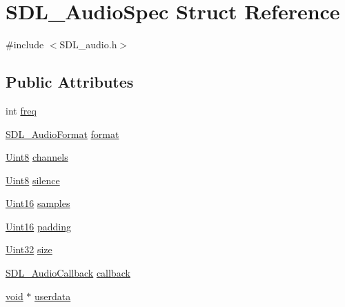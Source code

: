 \hypertarget{struct_s_d_l___audio_spec}{}\section{S\+D\+L\+\_\+\+Audio\+Spec Struct Reference}
\label{struct_s_d_l___audio_spec}


{\ttfamily \#include $<$S\+D\+L\+\_\+audio.\+h$>$}

\subsection*{Public Attributes}
\begin{DoxyCompactItemize}
\item 
int \mbox{\hyperlink{struct_s_d_l___audio_spec_a8b823ce46fc2e448cf7e6fc141aff6b2}{freq}}
\item 
\mbox{\hyperlink{_s_d_l__audio_8h_a491ed103fd25d920c4e6b7495217ce66}{S\+D\+L\+\_\+\+Audio\+Format}} \mbox{\hyperlink{struct_s_d_l___audio_spec_ae37c634cac5807762f184c8d5d49fc2d}{format}}
\item 
\mbox{\hyperlink{_s_d_l__stdinc_8h_a2944638813a090aa23e62f4da842c3e2}{Uint8}} \mbox{\hyperlink{struct_s_d_l___audio_spec_a31fe8b3710cf23bbef24be8a1749fe46}{channels}}
\item 
\mbox{\hyperlink{_s_d_l__stdinc_8h_a2944638813a090aa23e62f4da842c3e2}{Uint8}} \mbox{\hyperlink{struct_s_d_l___audio_spec_addc462c8a806e6c122eccf63482048f6}{silence}}
\item 
\mbox{\hyperlink{_s_d_l__stdinc_8h_a31fcc0a076c9068668173ee26d33e42b}{Uint16}} \mbox{\hyperlink{struct_s_d_l___audio_spec_a2cdf5e885808c10bfa2810b706e69f95}{samples}}
\item 
\mbox{\hyperlink{_s_d_l__stdinc_8h_a31fcc0a076c9068668173ee26d33e42b}{Uint16}} \mbox{\hyperlink{struct_s_d_l___audio_spec_a738371fc13b54cefef4db16994abeeb6}{padding}}
\item 
\mbox{\hyperlink{_s_d_l__stdinc_8h_add440eff171ea5f55cb00c4a9ab8672d}{Uint32}} \mbox{\hyperlink{struct_s_d_l___audio_spec_a154cf44743ecec78c36dc6c827dd2fdb}{size}}
\item 
\mbox{\hyperlink{_s_d_l__audio_8h_a379fcc25845e46bfa80cb3619fc2821c}{S\+D\+L\+\_\+\+Audio\+Callback}} \mbox{\hyperlink{struct_s_d_l___audio_spec_a1f8d05139f1679dcf359f49251233eac}{callback}}
\item 
\mbox{\hyperlink{_s_d_l__opengles2__gl2ext_8h_ae5d8fa23ad07c48bb609509eae494c95}{void}} $\ast$ \mbox{\hyperlink{struct_s_d_l___audio_spec_aeec9481666f5f0982c98d3878f175d9b}{userdata}}
\end{DoxyCompactItemize}


